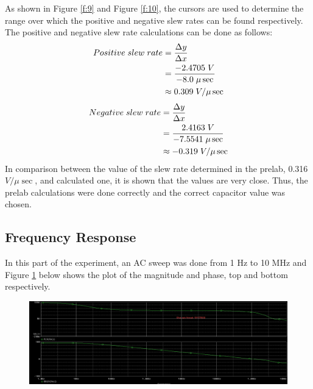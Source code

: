 \documentclass{article}
\begin{document}
	\pagebreak
	\noindent As shown in Figure \ref{f:9} and Figure \ref{f:10}, the cursors are used to determine the range over which the positive and negative slew rates can be found respectively.\\
	The positive and negative slew rate calculations can be done as follows:
	\begin{align*}
		Positive \hspace{1mm} slew \hspace{1mm} rate &= \frac{\Delta y}{\Delta x}\\
		&= \frac{-2.4705 \hspace{1mm} V}{-8.0 \hspace{1mm} \mu\sec}\\
		&\approx 0.309 \hspace{1mm} V/\mu\sec
	\end{align*}
	\begin{align*}
		Negative \hspace{1mm} slew \hspace{1mm} rate &= \frac{\Delta y}{\Delta x}\\
		&= \frac{2.4163 \hspace{1mm} V}{-7.5541 \hspace{1mm} \mu\sec}\\
		&\approx -0.319 \hspace{1mm} V/\mu\sec
	\end{align*}	
	In comparison between the value of the slew rate determined in the prelab, 0.316 $V/\mu\sec$, and calculated one, it is shown that the values are very close. 
	Thus, the prelab calculations were done correctly and the correct capacitor value was chosen.
	\subsection{Frequency Response}
	In this part of the experiment, an AC sweep was done from 1 Hz to 10 MHz and Figure \ref{f:11} below shows the plot of the magnitude and phase, top and bottom respectively.
	\begin{figure}[!ht]
		\centering
		\includegraphics[width=0.7\textheight]{3.0.png}
		\label{f:11}
	\end{figure}
	
\end{document}
